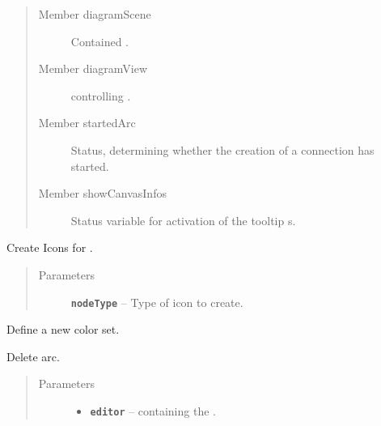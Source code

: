 \documentclass[a4paper,10pt,english]{sphinxmanual}
\begin{document}
\begin{fulllineitems}
\begin{quote}
\begin{description}
\item[{Member diagramScene}] \leavevmode
Contained .

\item[{Member diagramView}] \leavevmode
{} controlling .

\item[{Member startedArc}] \leavevmode
Status, determining whether the creation of a connection has started.

\item[{Member showCanvasInfos}] \leavevmode
Status variable for activation of the tooltip  s.

\end{description}\end{quote}

\begin{fulllineitems}
\label{gui_link:gui.DiagramEditor.DiagramEditor.createIcon}
Create Icons for .
\begin{quote}\begin{description}
\item[{Parameters}] \leavevmode
\textbf{\texttt{nodeType}} -- Type of icon to create.

\end{description}\end{quote}

\end{fulllineitems}


\begin{fulllineitems}
\label{gui_link:gui.DiagramEditor.DiagramEditor.defineNewToken}
Define a new color set.

\end{fulllineitems}


\begin{fulllineitems}
\label{gui_link:gui.DiagramEditor.DiagramEditor.deleteArc}
Delete arc.
\begin{quote}\begin{description}
\item[{Parameters}] \leavevmode\begin{itemize}
\item {} 
\textbf{\texttt{editor}} --  containing the .


\end{itemize}
\end{description}
\end{quote}
\end{fulllineitems}
\end{fulllineitems}
\end{document}
